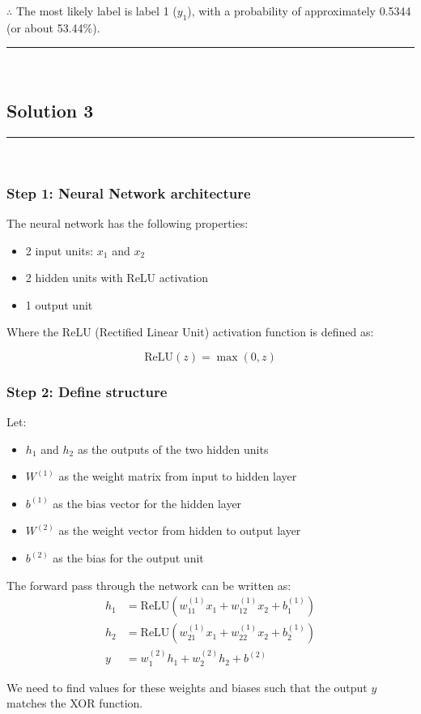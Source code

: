 \documentclass{article}
\begin{document}
\subsubsection*{\normalfont}{$\therefore$ The most likely label is label 1 ($y_1$), with a probability of approximately 0.5344 (or about 53.44\%).}

\noindent\rule{\textwidth}{0.4pt}\\

\newpage

\subsection*{Solution 3}
\noindent\rule{\textwidth}{0.4pt}\\


\subsubsection*{Step 1: Neural Network architecture}
\parbox{\textwidth}{
The neural network has the following properties:
\begin{itemize}
    \item 2 input units: $x_1$ and $x_2$
    \item 2 hidden units with ReLU activation
    \item 1 output unit
\end{itemize}

Where the ReLU (Rectified Linear Unit) activation function is defined as:

$$\text{ReLU}(z) = \max(0, z)$$

}

\subsubsection*{Step 2: Define structure}
\parbox{\textwidth}{
Let:
\begin{itemize}
    \item $h_1$ and $h_2$ as the outputs of the two hidden units
    \item $W^{(1)}$ as the weight matrix from input to hidden layer
    \item $b^{(1)}$ as the bias vector for the hidden layer
    \item $W^{(2)}$ as the weight vector from hidden to output layer
    \item $b^{(2)}$ as the bias for the output unit
\end{itemize}

The forward pass through the network can be written as:
\begin{align*}
h_1 &= \text{ReLU}(w_{11}^{(1)}x_1 + w_{12}^{(1)}x_2 + b_1^{(1)})\\
h_2 &= \text{ReLU}(w_{21}^{(1)}x_1 + w_{22}^{(1)}x_2 + b_2^{(1)})\\
y &= w_{1}^{(2)}h_1 + w_{2}^{(2)}h_2 + b^{(2)}
\end{align*}

We need to find values for these weights and biases such that the output $y$ matches the XOR function.
}
\end{document}
